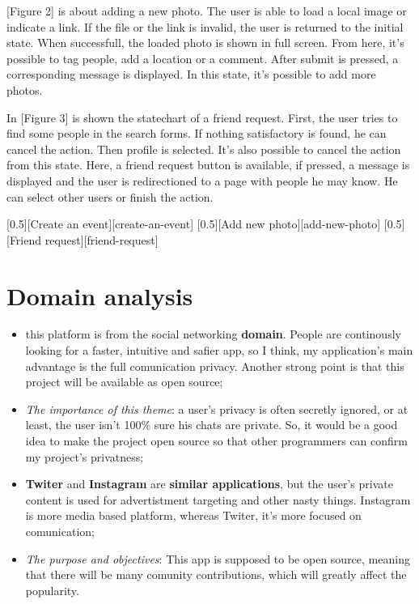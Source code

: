 \documentclass{article}
\begin{document}
		\bigskip
		[Figure 2] is about adding a new photo. The user is able to load a local image or indicate a link. If the file or the link is invalid, the user is returned to the initial state. When successfull, the loaded photo is shown in full screen. From here, it's possible to tag people, add a location or a comment. After submit is pressed, a corresponding message is displayed. In this state, it's possible to add more photos.
		
		\bigskip
		In [Figure 3] is shown the statechart of a friend request. First, the user tries to find some people in the search forms. If nothing satisfactory is found, he can cancel the action. Then profile is selected. It's also possible to cancel the action from this state. Here, a friend request button is available, if pressed, a message is displayed and the user is redirectioned to a page with people he may know. He can select other users or finish the action.

		[0.5][Create an event][create-an-event]
		[0.5][Add new photo][add-new-photo]
		[0.5][Friend request][friend-request]

	\section{Domain analysis}
		\begin{itemize}
			\item this platform is from the social networking \textbf{domain}. People are continously looking for a faster, intuitive and safier app, so I think, my application's main advantage is the full comunication privacy. Another strong point is that this project will be available as open source;
			
			\item \textit{The importance of this theme}: a user's privacy is often secretly ignored, or at least, the user isn't 100\% sure his chats are private. So, it would be a good idea to make the project open source so that other programmers can confirm my project's privatness;
			
			\item \textbf{Twiter} and \textbf{Instagram} are \textbf{similar applications}, but the user's private content is used for advertistment targeting and other nasty things. Instagram is more media based platform, whereas Twiter, it's more focused on comunication;
			
			\item \textit{The purpose and objectives}: This app is supposed to be open source, meaning that there will be many comunity contributions, which will greatly affect the popularity.
		\end{itemize}
\end{document}
